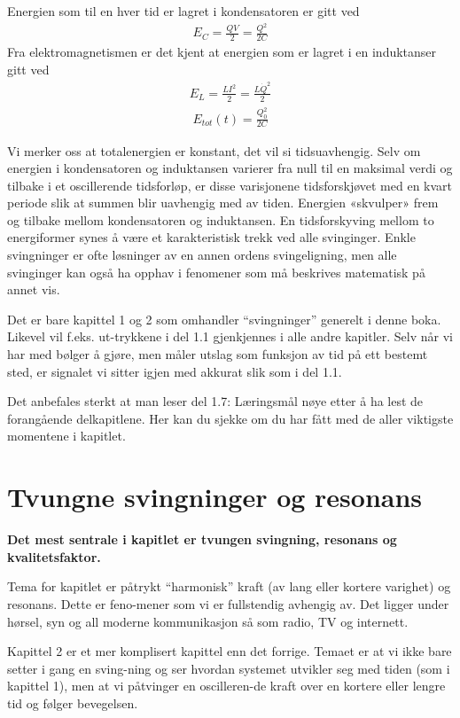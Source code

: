 \documentclass[12pt]{article}
\numberwithin{equation}{section}
\numberwithin{figure}{section}
\newcommand{\eq}[1]{{\small\begin{align}#1\end{align}}}
\begin{document}
\begin{tcolorbox}[title = Del 1.6 -- Energibetraktninger,breakable]
  Energien som til en hver tid er lagret i kondensatoren er gitt ved
  \eq{E_C = \frac{QV}{2} = \frac{Q^2}{2C}}
  \tcbline
  Fra elektromagnetismen er det kjent at energien som er lagret i en induktanser gitt ved
  \eq{E_L = \frac{LI^2}{2} = \frac{L\dot Q^2}{2}}
  \tcbline
  \eq{E_{tot}(t) = \frac{Q_0^2}{2C}}
  
  Vi merker oss at totalenergien er konstant, det vil si tidsuavhengig. 
  Selv om energien i kondensatoren og induktansen varierer fra null til en maksimal verdi 
  og tilbake i et oscillerende tidsforløp, er disse varisjonene tidsforskjøvet
  med en kvart periode slik at summen blir uavhengig med av tiden.
  Energien «skvulper» frem og tilbake mellom kondensatoren og induktansen.
  En tidsforskyving mellom to energiformer synes å være et karakteristisk trekk
  ved alle svinginger. Enkle svingninger er ofte løsninger av en annen ordens 
  svingeligning, men alle svinginger kan også ha opphav i fenomener som må beskrives
  matematisk på annet vis.
\end{tcolorbox}

Det er bare kapittel 1 og 2 som omhandler “svingninger” generelt i denne boka. Likevel vil f.eks. ut-trykkene i del 1.1 gjenkjennes i alle andre kapitler. Selv når vi har med bølger å gjøre, men måler utslag som funksjon av tid på ett bestemt sted, er signalet vi sitter igjen med akkurat slik som i del 1.1. 

Det anbefales sterkt at man leser del 1.7: Læringsmål nøye etter å ha lest de forangående delkapitlene. Her kan du sjekke om du har fått med de aller viktigste momentene i kapitlet.

\section{Tvungne svingninger og resonans}
\textbf{Det mest sentrale i kapitlet er tvungen svingning, resonans og kvalitetsfaktor.} 

Tema for kapitlet er påtrykt “harmonisk” kraft (av lang eller kortere varighet) og resonans. Dette er feno-mener som vi er fullstendig avhengig av. Det ligger under hørsel, syn og all moderne kommunikasjon så som radio, TV og internett. 

Kapittel 2 er et mer komplisert kapittel enn det forrige. Temaet er at vi ikke bare setter i gang en sving-ning og ser hvordan systemet utvikler seg med tiden (som i kapittel 1), men at vi påtvinger en oscilleren-de kraft over en kortere eller lengre tid og følger bevegelsen. 
\end{document}
